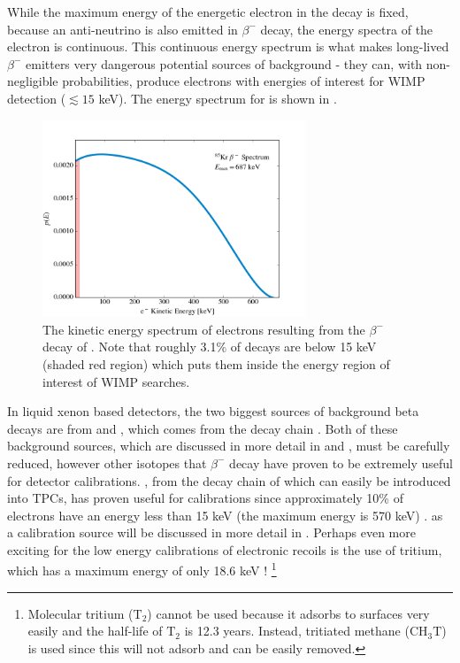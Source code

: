 While the maximum energy of the energetic electron in the decay is fixed, because an anti-neutrino is also emitted in $\beta^-$ decay, the energy spectra of the electron is continuous.  This continuous energy spectrum is what makes long-lived $\beta^-$ emitters very dangerous potential sources of background - they can, with non-negligible probabilities, produce electrons with energies of interest for WIMP detection ($\lesssim 15$ keV).  The energy spectrum for \krypton{} is shown in .

\begin{figure}[t]
	\centering
	\includegraphics[width=0.7\textwidth]{kr85_beta_rates}
	\caption{The kinetic energy spectrum of electrons resulting from the $\beta^-$ decay of  \cite{mantel1972beta}.  Note that roughly 3.1\% of decays are below 15 keV (shaded red region) which puts them inside the energy region of interest of WIMP searches.}
	\label{fig:kr85_beta_decay}
\end{figure}


In liquid xenon based detectors, the two biggest sources of background beta decays are from  and , which comes from the  decay chain \cite{aprile2017first}.  Both of these background sources, which are discussed in more detail in  and ,  must be carefully reduced, however other isotopes that $\beta^-$ decay have proven to be extremely useful for detector calibrations.  , from the decay chain of  which can easily be introduced into TPCs,  has proven useful for calibrations since approximately 10\% of electrons have an energy less than 15 keV (the maximum energy is 570 keV) \cite{aprile2017radon}.   as a calibration source will be discussed in more detail in .  Perhaps even more exciting for the low energy calibrations of electronic recoils is the use of tritium, which has a maximum energy of only 18.6 keV \cite{akerib2016tritium, aprile2017tritium}! \footnote{Molecular tritium ($\textrm{T}_2$) cannot be used because it adsorbs to surfaces very easily and the half-life of $\textrm{T}_2$ is 12.3 years.  Instead, tritiated methane ($\textrm{CH}_3\textrm{T}$) is used since this will not adsorb and can be easily removed.}  

